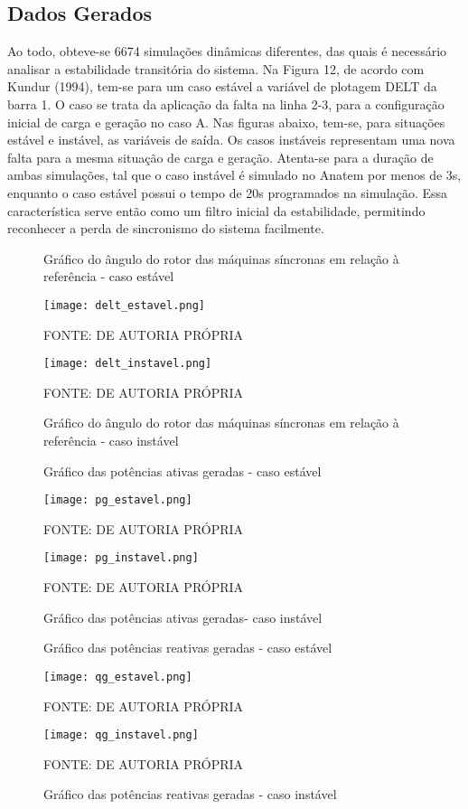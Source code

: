 \documentclass[12pt,oneside,a4paper,chapter=TITLE,section=TITLE,sumario=tradicional,english,brazil]{abntex2}
\begin{document}
\subsection{Dados Gerados}
Ao todo, obteve-se 6674 simulações dinâmicas diferentes, das quais é necessário analisar a estabilidade transitória do sistema. Na Figura 12, de acordo com Kundur (1994), tem-se para um caso estável a variável de plotagem DELT da barra 1. O caso se trata da aplicação da falta na linha 2-3, para a configuração inicial de carga e geração no caso A. Nas figuras abaixo, tem-se, para situações estável e instável, as variáveis de saída. Os casos instáveis representam uma nova falta para a mesma situação de carga e geração. Atenta-se para a duração de ambas simulações, tal que o caso instável é simulado no Anatem por menos de 3s, enquanto o caso estável possui o tempo de 20s programados na simulação. Essa característica serve então como um filtro inicial da estabilidade, permitindo reconhecer a perda de sincronismo do sistema facilmente.\par 
\begin{figure}[h]
\centering
\caption{Gráfico do ângulo do rotor das máquinas síncronas em relação à referência - caso estável}
 \texttt{[image: delt\_estavel.png]}
 \par 
 FONTE: DE AUTORIA PRÓPRIA
 \par 
\caption{Gráfico do ângulo do rotor das máquinas síncronas em relação à referência - caso instável}
 \texttt{[image: delt\_instavel.png]}
  \par 
 FONTE: DE AUTORIA PRÓPRIA
 \par 
 \end{figure}
 \newpage 
 \begin{figure}[h]
\centering
\caption{Gráfico das potências ativas geradas - caso estável}
 \texttt{[image: pg\_estavel.png]}
  \par 
 FONTE: DE AUTORIA PRÓPRIA
 \par 
\caption{Gráfico das potências ativas geradas- caso instável}
 \texttt{[image: pg\_instavel.png]}
  \par 
 FONTE: DE AUTORIA PRÓPRIA
 \par 
 \end{figure}
 \newpage
 \begin{figure}[h]
\centering
 \caption{Gráfico das potências reativas geradas - caso estável}
 \texttt{[image: qg\_estavel.png]}
  \par 
 FONTE: DE AUTORIA PRÓPRIA
 \par 
\caption{Gráfico das potências reativas geradas - caso instável}
 \texttt{[image: qg\_instavel.png]}
  \par 
 FONTE: DE AUTORIA PRÓPRIA
 \par 
 \end{figure}
\end{document}

